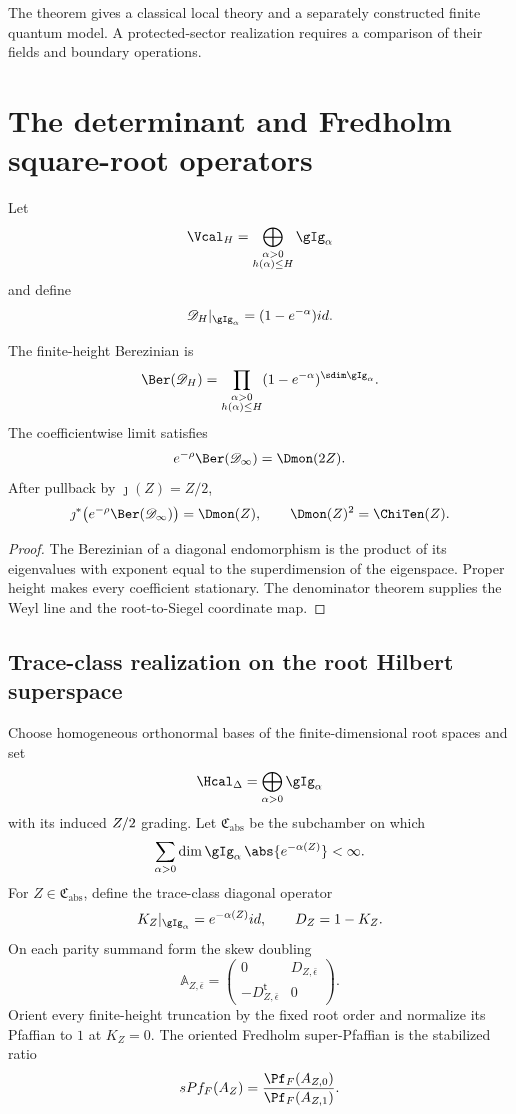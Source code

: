 The theorem gives a classical local theory and a separately constructed finite quantum model. A protected-sector realization requires a comparison of their fields and boundary operations.

\chapter{The determinant and Fredholm square-root operators}
Let
\[
 \Vcal_H=\bigoplus_{\substack{\alpha>0\\h(\alpha)\le H}}\gIg_\alpha
\]
and define
\[
 \mathscr D_H|_{\gIg_\alpha}=(1-e^{-\alpha})\id.
\]

\begin{theorem}
The finite-height Berezinian is
\[
 \Ber(\mathscr D_H)
 =\prod_{\substack{\alpha>0\\h(\alpha)\le H}}
 (1-e^{-\alpha})^{\sdim\gIg_\alpha}.
\]
The coefficientwise limit satisfies
\[
 e^{-\rho}\Ber(\mathscr D_\infty)=\Dmon(2Z).
\]
After pullback by $\jmath(Z)=Z/2$,
\[
 \jmath^*\!\left(e^{-\rho}\Ber(\mathscr D_\infty)\right)=\Dmon(Z),
 \qquad \Dmon(Z)^2=\ChiTen(Z).
\]
\end{theorem}
\begin{proof}
The Berezinian of a diagonal endomorphism is the product of its eigenvalues with exponent equal to the superdimension of the eigenspace.  Proper height makes every coefficient stationary.  The denominator theorem supplies the Weyl line and the root-to-Siegel coordinate map.
\end{proof}

\section{Trace-class realization on the root Hilbert superspace}
Choose homogeneous orthonormal bases of the finite-dimensional root spaces and set
\[
 \Hcal_{\Delta}=\widehat\bigoplus_{\alpha>0}\gIg_\alpha
\]
with its induced $Z/2$ grading.  Let $\mathfrak C_{\mathrm{abs}}$ be the subchamber on which
\[
 \sum_{\alpha>0}\dim\gIg_\alpha\,
       \abs{e^{-\alpha(Z)}}<\infty.
\]
For $Z\in\mathfrak C_{\mathrm{abs}}$, define the trace-class diagonal operator
\[
 K_Z|_{\gIg_\alpha}=e^{-\alpha(Z)}\id,
 \qquad D_Z=1-K_Z.
\]
On each parity summand form the skew doubling
\[
 \mathbb A_{Z,\bar\epsilon}=
 \begin{pmatrix}0&D_{Z,\bar\epsilon}\\-D_{Z,\bar\epsilon}^{\mathsf t}&0\end{pmatrix}.
\]
Orient every finite-height truncation by the fixed root order and normalize its Pfaffian to $1$ at $K_Z=0$.  The oriented Fredholm super-Pfaffian is the stabilized ratio
\[
 \operatorname{sPf}_{F}(\mathbb A_Z)
 =\frac{\Pf_F(\mathbb A_{Z,\bar0})}
        {\Pf_F(\mathbb A_{Z,\bar1})}.
\]

